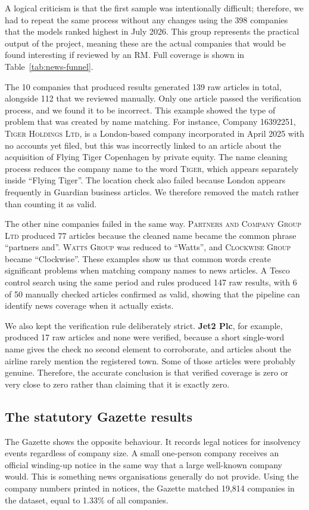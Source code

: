 \documentclass[    author={Samuel Menon Demelo; Sneha Saphala Ram Prasad; 
Viktor Ander Lindholm; Vishal Khatri},
               supervisor={Prof. Fernando Moreno-Pino},
                   degree={MSc},
                    title={Lloyds Commercial Banking Intelligence},
                 subtitle={Ranking SME Lending, Risk and Growth Prospects for Lloyds Banking Group},
                     type={},
                     year={2026}]{dissertation}
\begin{document}
A logical criticism is that the first sample was intentionally difficult; therefore, we had to repeat the same process without any changes using the 398 companies that the models ranked highest in July 2026. This group represents the practical output of the project, meaning these are the actual companies that would be found interesting if reviewed by an RM. Full coverage is shown in Table~\ref{tab:news-funnel}.

The 10 companies that produced results generated 139 raw articles in total, alongside 112 that we reviewed manually. Only one article passed the verification process, and we found it to be incorrect. This example showed the type of problem that was created by name matching. For instance, Company 16392251, \textsc{Tiger Holdings Ltd}, is a London-based company incorporated in April 2025 with no accounts yet filed, but this was incorrectly linked to an article about the acquisition of Flying Tiger Copenhagen by private equity. The name cleaning process reduces the company name to the word \textsc{Tiger}, which appears separately inside ``Flying Tiger''. The location check also failed because London appears frequently in Guardian business articles. We therefore removed the match rather than counting it as valid.

The other nine companies failed in the same way. \textsc{Partners and Company Group Ltd} produced 77 articles because the cleaned name became the common phrase ``partners and''. \textsc{Watts Group} was reduced to ``Watts'', and \textsc{Clockwise Group} became ``Clockwise''. These examples show us that common words create significant problems when matching company names to news articles. A Tesco control search using the same period and rules produced 147 raw results, with 6 of 50 manually checked articles confirmed as valid, showing that the pipeline can identify news coverage when it actually exists.

We also kept the verification rule deliberately strict. \textbf{Jet2 Plc}, for example, produced 17 raw articles and none were verified, because a short single-word name gives the check no second element to corroborate, and articles about the airline rarely mention the registered town. Some of those articles were probably genuine. Therefore, the accurate conclusion is that verified coverage is zero or very close to zero rather than claiming that it is exactly zero.

\subsection{The statutory Gazette results}
The Gazette shows the opposite behaviour. It records legal notices for insolvency events regardless of company size. A small one-person company receives an official winding-up notice in the same way that a large well-known company would. This is something news organisations generally do not provide. Using the company numbers printed in notices, the Gazette matched 19,814 companies in the dataset, equal to 1.33\% of all companies.
\end{document}
